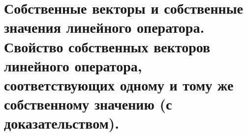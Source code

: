 \section{
    Собственные векторы и собственные значения линейного оператора. Свойство собственных векторов линейного оператора, соответствующих одному и тому же собственному значению (с доказательством).
}
